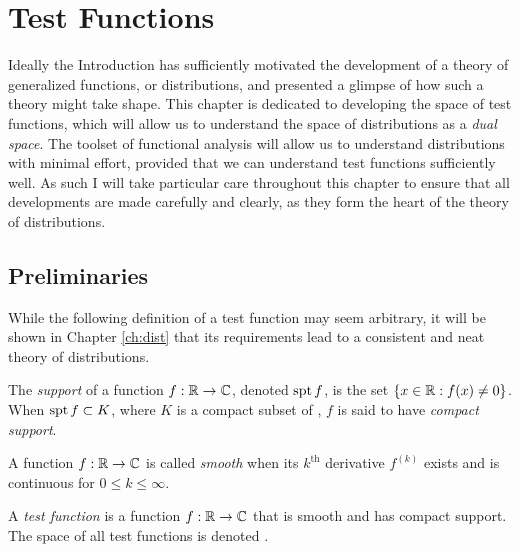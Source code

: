 \chapter{Test Functions}
\label{ch:test}

  Ideally the Introduction has sufficiently motivated the development of a theory of generalized functions, or distributions, and presented a glimpse of how such a theory might take shape.
  This chapter is dedicated to developing the space of test functions, which will allow us to understand the space of distributions as a \emph{dual space}.
  The toolset of functional analysis will allow us to understand distributions with minimal effort, provided that we can understand test functions sufficiently well.
  As such I will take particular care throughout this chapter to ensure that all developments are made carefully and clearly, as they form the heart of the theory of distributions.

  \section{Preliminaries}

    While the following definition of a test function may seem arbitrary, it will be shown in Chapter \ref{ch:dist} that its requirements lead to a consistent and neat theory of distributions.
    \begin{defn}
      The \emph{support} of a function $f:\mathbb{R}\rightarrow\mathbb{C}$, denoted $\operatorname{spt} f$, is the set $\{x\in\mathbb{R}: f(x)\ne0\}$.
      When $\operatorname{spt} f \subset K$, where $K$ is a compact subset of \R, $f$ is said to have \emph{compact support}.
    \end{defn}
    \begin{defn}
      A function $f:\mathbb{R}\rightarrow\mathbb{C}$ is called \emph{smooth} when its $k^\text{th}$ derivative $f^{(k)}$ exists and is continuous for $0\le k \le\infty$.
    \end{defn}
    \begin{defn}
      A \emph{test function} is a function $f:\mathbb{R}\rightarrow\mathbb{C}$ that is smooth and has compact support.
      The space of all test functions is denoted \D.
    \end{defn}

